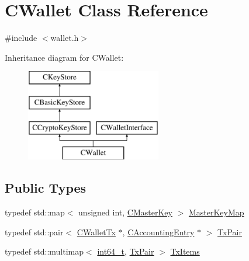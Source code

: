 \hypertarget{class_c_wallet}{}\section{C\+Wallet Class Reference}
\label{class_c_wallet}


{\ttfamily \#include $<$wallet.\+h$>$}

Inheritance diagram for C\+Wallet\+:\begin{figure}[H]
\begin{center}
\leavevmode
\includegraphics[height=4.000000cm]{class_c_wallet}
\end{center}
\end{figure}
\subsection*{Public Types}
\begin{DoxyCompactItemize}
\item 
typedef std\+::map$<$ unsigned int, \hyperlink{class_c_master_key}{C\+Master\+Key} $>$ \hyperlink{class_c_wallet_a0e21167a320a0ab8f15d0e11c6749a0e}{Master\+Key\+Map}
\item 
typedef std\+::pair$<$ \hyperlink{class_c_wallet_tx}{C\+Wallet\+Tx} $\ast$, \hyperlink{class_c_accounting_entry}{C\+Accounting\+Entry} $\ast$ $>$ \hyperlink{class_c_wallet_ad1557a7d200f70bc97319376a24c98a7}{Tx\+Pair}
\item 
typedef std\+::multimap$<$ \hyperlink{stdint_8h_adec1df1b8b51cb32b77e5b86fff46471}{int64\+\_\+t}, \hyperlink{class_c_wallet_ad1557a7d200f70bc97319376a24c98a7}{Tx\+Pair} $>$ \hyperlink{class_c_wallet_ac35fb148c0967ad24db292435b54ad85}{Tx\+Items}
\end{DoxyCompactItemize}
